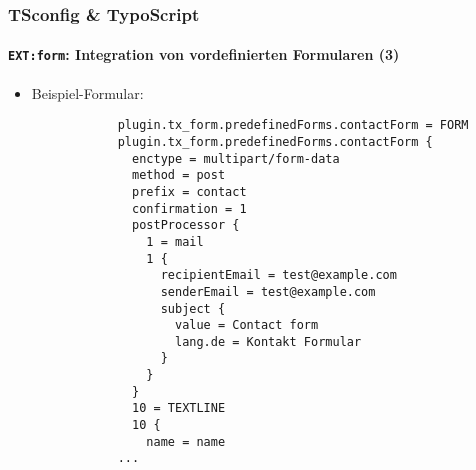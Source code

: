 \begin{frame}[fragile]
	\frametitle{TSconfig \& TypoScript}
	\framesubtitle{\texttt{EXT:form}: Integration von vordefinierten Formularen (3)}

	\lstset{basicstyle=\tiny\ttfamily}

	\begin{itemize}

		\item Beispiel-Formular:

		\begin{lstlisting}
			plugin.tx_form.predefinedForms.contactForm = FORM
			plugin.tx_form.predefinedForms.contactForm {
			  enctype = multipart/form-data
			  method = post
			  prefix = contact
			  confirmation = 1
			  postProcessor {
			    1 = mail
			    1 {
			      recipientEmail = test@example.com
			      senderEmail = test@example.com
			      subject {
			        value = Contact form
			        lang.de = Kontakt Formular
			      }
			    }
			  }
			  10 = TEXTLINE
			  10 {
			    name = name
			...
		\end{lstlisting}

	\end{itemize}

\end{frame}


